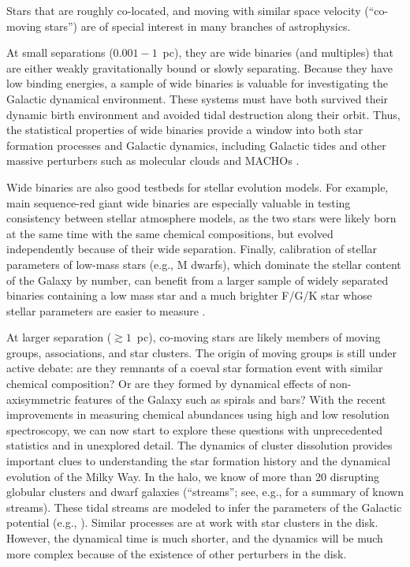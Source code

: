 \documentclass[manuscript, letterpaper]{aastex6}
\begin{document}
Stars that are roughly co-located, and moving with similar space velocity (``co-moving stars'')
are of special interest in many branches of astrophysics.  

At small separations ($0.001-1$~pc), they are wide binaries (and
multiples) that are either weakly gravitationally bound or
slowly separating.
Because they have low binding energies, a sample of wide binaries is valuable
for investigating the Galactic dynamical environment.
These systems must have both survived their dynamic birth environment and 
avoided tidal destruction along their orbit.
Thus, the statistical properties of wide binaries provide a window into both star formation
processes and Galactic dynamics,
including Galactic tides and other massive perturbers such as molecular clouds
and MACHOs \citep{Yoo:2004aa,Allen:2014aa}.

Wide binaries are also good testbeds for stellar evolution models.
For example, main sequence-red giant wide binaries are especially valuable in
testing consistency between stellar atmosphere models, as the
two stars were likely born at the same time with the same chemical compositions,
but evolved independently because of their wide separation.
Finally, calibration of stellar parameters of low-mass stars (e.g., M dwarfs),
which dominate the stellar content of the Galaxy by number, can benefit from
a larger sample of widely separated binaries containing a low mass star and a
much brighter F/G/K star whose stellar parameters are easier to measure
\citep[e.g.,][]{Rojas-Ayala:2012aa}.

At larger separation ($\gtrsim 1$~pc), co-moving stars are likely members of
moving groups, associations, and star clusters.
The origin of moving groups is still under active debate: are they remnants of a coeval
star formation event with similar chemical composition? Or are they formed by
dynamical effects of non-axisymmetric features of the Galaxy such as spirals
and bars? With the recent improvements in measuring chemical abundances
using high and low resolution spectroscopy, we can now start to explore these questions
with unprecedented statistics and in unexplored detail.
The dynamics of cluster dissolution provides important clues to understanding
the star formation history and the dynamical evolution of the Milky Way.
In the halo, we know of more than 20 disrupting globular clusters and dwarf galaxies
(``streams''; see, e.g., \citealt{Grillmair:2016} for a summary of known streams).
These tidal streams are modeled to infer the parameters of the Galactic
potential (e.g., \citealt{Kupper:2015}).
Similar processes are at work with star clusters in the disk.
However, the dynamical time is much shorter, and the dynamics will be much more
complex because of the existence of other perturbers in the disk.
\end{document}

